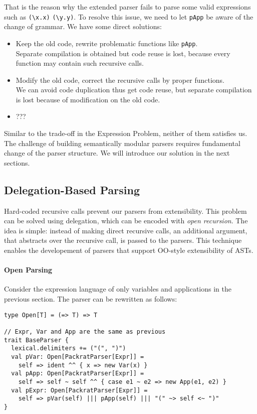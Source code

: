 That is the reason why the extended parser fails to parse some valid expressions such as \lstinline{(\x.x)} \lstinline{(\y.y)}. To resolve this issue, we need to let \lstinline{pApp} be aware of the change of grammar. We have some direct solutions:

\begin{itemize}
    \item Keep the old code, rewrite problematic functions like \lstinline{pApp}. \\Separate compilation is obtained but code reuse is lost, because every function may contain such recursive calls.
    \item Modify the old code, correct the recursive calls by proper functions. \\We can avoid code duplication thus get code reuse, but separate compilation is lost because of modification on the old code.
    \item ??? 
\end{itemize}

Similar to the trade-off in the Expression Problem, neither of them satisfies us. The challenge of building semantically modular parsers requires fundamental change of the parser structure. We will introduce our solution in the next sections.

\subsection{Delegation-Based Parsing}\label{subsec:overview-firstlook}

Hard-coded recursive calls prevent our parsers from extensibility.
This problem can be solved using delegation, which can be encoded with \textit{open recursion}. The idea is
simple: instead of making direct recursive calls, an additional
argument, that abstracts over the recursive call, is passed to the
parsers. This technique enables the developement of parsers that
support OO-style extensibility of ASTs.

\paragraph{Open Parsing} Consider the expression language of only variables and applications in the previous section. The parser can be rewritten as follows:

\begin{lstlisting}
type Open[T] = (=> T) => T

// Expr, Var and App are the same as previous
trait BaseParser {
  lexical.delimiters += ("(", ")")
  val pVar: Open[PackratParser[Expr]] =
    self => ident ^^ { x => new Var(x) }
  val pApp: Open[PackratParser[Expr]] =
    self => self ~ self ^^ { case e1 ~ e2 => new App(e1, e2) }
  val pExpr: Open[PackratParser[Expr]] =
    self => pVar(self) ||| pApp(self) ||| "(" ~> self <~ ")"
}
\end{lstlisting}

